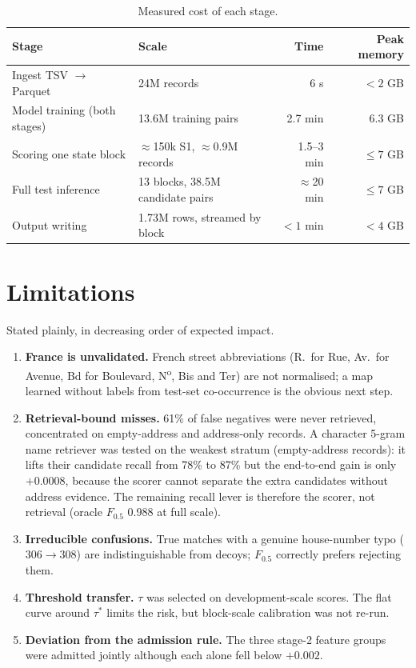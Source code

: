 \documentclass[10pt]{article}
\newcommand{\Fh}{F_{0.5}}
\begin{document}
\begin{table}[htbp]
\centering\small
\caption{Measured cost of each stage.}
\label{tab:compute}
\begin{tabular}{@{}llrr@{}}
\toprule
Stage & Scale & Time & Peak memory \\
\midrule
Ingest TSV $\to$ Parquet & 24M records & 6 s & $<2$ GB \\
Model training (both stages) & 13.6M training pairs & 2.7 min & 6.3 GB \\
Scoring one state block & $\approx$150k S1, $\approx$0.9M records & 1.5--3 min & $\le 7$ GB \\
Full test inference & 13 blocks, 38.5M candidate pairs & $\approx$20 min & $\le 7$ GB \\
Output writing & 1.73M rows, streamed by block & $<1$ min & $<4$ GB \\
\bottomrule
\end{tabular}
\end{table}

\section{Limitations}
Stated plainly, in decreasing order of expected impact.
\begin{enumerate}
\item \textbf{France is unvalidated.} French street abbreviations (R.\ for Rue, Av.\ for Avenue, Bd for Boulevard, N\textsuperscript{o}, Bis and Ter) are not normalised; a map learned without labels from test-set co-occurrence is the obvious next step.
\item \textbf{Retrieval-bound misses.} 61\% of false negatives were never retrieved, concentrated on empty-address and address-only records. A character 5-gram name retriever was tested on the weakest stratum (empty-address records): it lifts their candidate recall from 78\% to 87\% but the end-to-end gain is only $+0.0008$, because the scorer cannot separate the extra candidates without address evidence. The remaining recall lever is therefore the scorer, not retrieval (oracle $\Fh$ 0.988 at full scale).
\item \textbf{Irreducible confusions.} True matches with a genuine house-number typo ($306\to308$) are indistinguishable from decoys; $\Fh$ correctly prefers rejecting them.
\item \textbf{Threshold transfer.} $\tau$ was selected on development-scale scores. The flat curve around $\tau^*$ limits the risk, but block-scale calibration was not re-run.
\item \textbf{Deviation from the admission rule.} The three stage-2 feature groups were admitted jointly although each alone fell below $+0.002$.
\end{enumerate}
\end{document}
